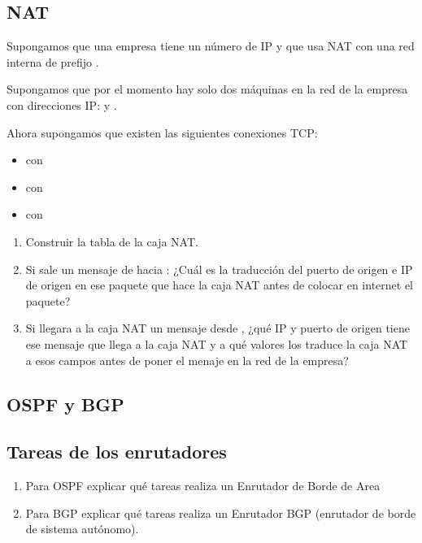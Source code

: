 \documentclass[12pt]{report}
\begin{document}
\begin{exer}
\section{NAT \sfour}
Supongamos que una empresa tiene un número de IP  y que usa NAT con una red interna de prefijo .

Supongamos que por el momento hay solo dos máquinas en la red de la empresa con direcciones IP:  y . 

Ahora supongamos que existen las siguientes conexiones TCP:

\begin{itemize}
\item {} con 
\item {} con 
\item {} con 
\end{itemize}

\begin{enumerate}
\item Construir la tabla de la caja NAT.
\item Si sale un mensaje de  hacia : ¿Cuál es la traducción del
puerto de origen e IP de origen en ese paquete que hace la caja NAT antes de colocar en internet el paquete?
\item Si llegara a la caja NAT un mensaje desde , ¿qué IP y puerto de origen tiene
ese mensaje que llega a la caja NAT y a qué valores los traduce la caja NAT a esos campos
antes de poner el menaje en la red de la empresa?
\end{enumerate}
\end{exer}

\begin{exer}
\section{OSPF y BGP}
\subsection{Tareas de los enrutadores \stwo \steo}
\begin{enumerate}
\item Para OSPF explicar qué tareas realiza un Enrutador de Borde de Area
\item Para BGP explicar qué tareas realiza un Enrutador BGP (enrutador de borde de sistema autónomo).
\end{enumerate}
\end{exer}
\end{document}
